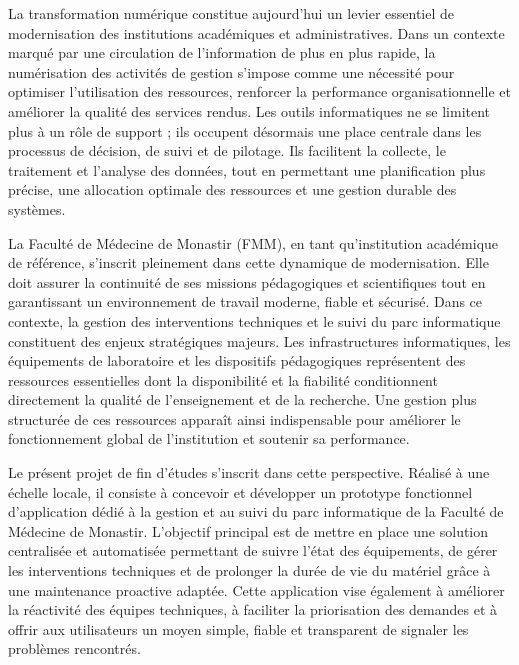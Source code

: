 \vspace{1cm}
\setcounter{chapter}{0}
\label{chap:introduction}


La transformation numérique constitue aujourd’hui un levier essentiel de modernisation des institutions académiques et administratives. Dans un contexte marqué par une circulation de l’information de plus en plus rapide, la numérisation des activités de gestion s’impose comme une nécessité pour optimiser l’utilisation des ressources, renforcer la performance organisationnelle et améliorer la qualité des services rendus. Les outils informatiques ne se limitent plus à un rôle de support ; ils occupent désormais une place centrale dans les processus de décision, de suivi et de pilotage. Ils facilitent la collecte, le traitement et l’analyse des données, tout en permettant une planification plus précise, une allocation optimale des ressources et une gestion durable des systèmes.

La Faculté de Médecine de Monastir (FMM), en tant qu’institution académique de référence, s’inscrit pleinement dans cette dynamique de modernisation. Elle doit assurer la continuité de ses missions pédagogiques et scientifiques tout en garantissant un environnement de travail moderne, fiable et sécurisé. Dans ce contexte, la gestion des interventions techniques et le suivi du parc informatique constituent des enjeux stratégiques majeurs. Les infrastructures informatiques, les équipements de laboratoire et les dispositifs pédagogiques représentent des ressources essentielles dont la disponibilité et la fiabilité conditionnent directement la qualité de l’enseignement et de la recherche. Une gestion plus structurée de ces ressources apparaît ainsi indispensable pour améliorer le fonctionnement global de l’institution et soutenir sa performance.

Le présent projet de fin d’études s’inscrit dans cette perspective. Réalisé à une échelle locale, il consiste à concevoir et développer un prototype fonctionnel d’application dédié à la gestion et au suivi du parc informatique de la Faculté de Médecine de Monastir. L’objectif principal est de mettre en place une solution centralisée et automatisée permettant de suivre l’état des équipements, de gérer les interventions techniques et de prolonger la durée de vie du matériel grâce à une maintenance proactive adaptée. Cette application vise également à améliorer la réactivité des équipes techniques, à faciliter la priorisation des demandes et à offrir aux utilisateurs un moyen simple, fiable et transparent de signaler les problèmes rencontrés.

